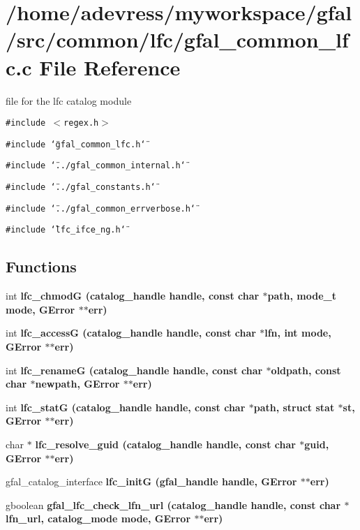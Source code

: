 \section{/home/adevress/myworkspace/gfal/src/common/lfc/gfal\_\-common\_\-lfc.c File Reference}
\label{gfal__common__lfc_8c}
file for the lfc catalog module 

{\tt \#include $<$regex.h$>$}\par
{\tt \#include \char`\"{}gfal\_\-common\_\-lfc.h\char`\"{}}\par
{\tt \#include \char`\"{}../gfal\_\-common\_\-internal.h\char`\"{}}\par
{\tt \#include \char`\"{}../gfal\_\-constants.h\char`\"{}}\par
{\tt \#include \char`\"{}../gfal\_\-common\_\-errverbose.h\char`\"{}}\par
{\tt \#include \char`\"{}lfc\_\-ifce\_\-ng.h\char`\"{}}\par
\subsection*{Functions}
\begin{CompactItemize}
\item 
int \bf{lfc\_\-chmod\-G} (catalog\_\-handle handle, const char $\ast$path, mode\_\-t mode, GError $\ast$$\ast$err)
\item 
int \bf{lfc\_\-access\-G} (catalog\_\-handle handle, const char $\ast$lfn, int mode, GError $\ast$$\ast$err)
\item 
int \bf{lfc\_\-rename\-G} (catalog\_\-handle handle, const char $\ast$oldpath, const char $\ast$newpath, GError $\ast$$\ast$err)
\item 
int \bf{lfc\_\-stat\-G} (catalog\_\-handle handle, const char $\ast$path, struct stat $\ast$st, GError $\ast$$\ast$err)
\item 
char $\ast$ \bf{lfc\_\-resolve\_\-guid} (catalog\_\-handle handle, const char $\ast$guid, GError $\ast$$\ast$err)
\item 
gfal\_\-catalog\_\-interface \bf{lfc\_\-init\-G} (gfal\_\-handle handle, GError $\ast$$\ast$err)
\item 
gboolean \bf{gfal\_\-lfc\_\-check\_\-lfn\_\-url} (catalog\_\-handle handle, const char $\ast$lfn\_\-url, catalog\_\-mode mode, GError $\ast$$\ast$err)
\end{CompactItemize}


